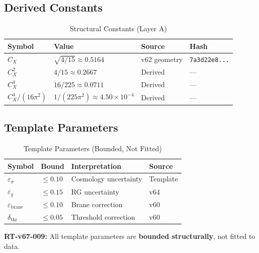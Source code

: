 \documentclass[11pt,letterpaper]{article}
\newcommand{\eps}{\varepsilon}
\begin{document}
\subsection{Derived Constants}
\label{subsec:derived-constants}

\begin{table}[h!]
\centering
\caption{Structural Constants (Layer A)}
\label{tab:constants}
\begin{tabular}{llll}
\toprule
Symbol & Value & Source & Hash \\
\midrule
$C_X$ & $\sqrt{4/15} \approx 0.5164$ & v62 geometry & \texttt{7a3d22e8...} \\
$C_X^2$ & $4/15 \approx 0.2667$ & Derived & --- \\
$C_X^4$ & $16/225 \approx 0.0711$ & Derived & --- \\
$C_X^4/(16\pi^2)$ & $1/(225\pi^2) \approx 4.50 \times 10^{-4}$ & Derived & --- \\
\bottomrule
\end{tabular}
\end{table}

\subsection{Template Parameters}
\label{subsec:template-params}

\begin{table}[h!]
\centering
\caption{Template Parameters (Bounded, Not Fitted)}
\label{tab:template-params}
\begin{tabular}{llll}
\toprule
Symbol & Bound & Interpretation & Source \\
\midrule
$\eps_\sigma$ & $\leq 0.10$ & Cosmology uncertainty & Template \\
$\eps_g$ & $\leq 0.15$ & RG uncertainty & v64 \\
$\eps_{\text{brane}}$ & $\leq 0.10$ & Brane correction & v60 \\
$\delta_{\text{thr}}$ & $\leq 0.05$ & Threshold correction & v60 \\
\bottomrule
\end{tabular}
\end{table}

\begin{reviewertrap}
\textbf{RT-v67-009:} All template parameters are \textbf{bounded structurally}, not fitted to data.
\end{reviewertrap}

\end{document}
